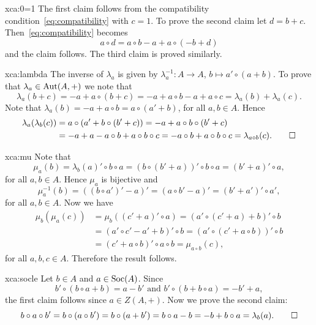 \begin{sol}{xca:0=1}
The first claim follows from the compatibility condition~\eqref{eq:compatibility} with
$c=1$.  To prove the second claim let $d=b+c$.
Then~\eqref{eq:compatibility} becomes 
\[
	a\circ d =a\circ b-a+a\circ (-b+d)
\]
and the claim follows. The third claim is
proved similarly.
\end{sol}

\begin{sol}{xca:lambda}
The inverse of $\lambda_a$ is given by $\lambda^{-1}_a\colon A\to A$, $b\mapsto a'\circ (a+b)$. To prove
that $\lambda_a\in\operatorname{Aut}(A,+)$ we note that
\[
\lambda_a(b+c)=-a+a\circ(b+c)=-a+a\circ b-a+a\circ c=\lambda_a(b)+\lambda_a(c).
\]
Note that $\lambda_a(b)=-a+a\circ b=a\circ (a'+b)$, for all $a,b\in A$. Hence 
\begin{align*}
\lambda_a(\lambda_b(c))&=a\circ (a'+b\circ (b'+c))=-a+a\circ b\circ (b'+c)\\
&=-a+a-a\circ b+a\circ b\circ c=-a\circ b+a\circ b\circ c=\lambda_{a\circ b}(c).\qedhere    
\end{align*}
\end{sol}

\begin{sol}{xca:mu}
    Note that
    \[\mu_a(b)=\lambda_b(a)'\circ b\circ a=(b\circ (b'+a))'\circ b\circ a=(b'+a)'\circ a,\]
    for all $a,b\in A$. Hence $\mu_a$ is bijective and
    \[\mu_a^{-1}(b)=((b\circ a')'-a)'=(a\circ b'-a)'=(b'+a')'\circ a',\]
    for all $a,b\in A$. Now we have
    \begin{align*}
        \mu_b(\mu_a(c))&=\mu_b((c'+a)'\circ a)=(a'\circ (c'+a)+b)'\circ b\\
        &=(a'\circ c'-a'+b)'\circ b=(a'\circ (c'+a\circ b))'\circ b\\
        &=(c'+a\circ b)'\circ a\circ b=\mu_{a\circ b}(c),
    \end{align*}
    for all $a,b,c\in A$. Therefore the result follows.
\end{sol}

\begin{sol}{xca:socle}
    Let $b\in A$ and $a\in\operatorname{Soc}(A)$. Since   
    \[
    b'\circ (b\circ a+b)=a-b'
    \text{ and }
    b'\circ (b+b\circ a)=-b'+a,
    \]
    the first claim follows since
    $a\in Z(A,+)$.
    Now we prove the second claim:
    \[
    b\circ a\circ b'=b\circ (a\circ b')=b\circ (a+b')=b\circ a-b=-b+b\circ
    a=\lambda_b(a).\qedhere
    \]
\end{sol}

